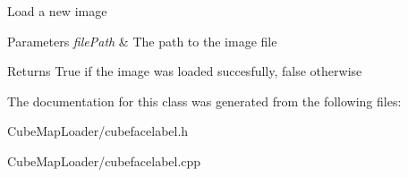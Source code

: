 \label{class_cube_face_label_af08e16abf6ad76b4bde6c39753e76042}
\-Load a new image 
\begin{DoxyParams}{\-Parameters}
{\em file\-Path} & \-The path to the image file \\
\hline
\end{DoxyParams}
\begin{DoxyReturn}{\-Returns}
\-True if the image was loaded succesfully, false otherwise 
\end{DoxyReturn}


\-The documentation for this class was generated from the following files\-:\begin{DoxyCompactItemize}
\item 
\-Cube\-Map\-Loader/cubefacelabel.\-h\item 
\-Cube\-Map\-Loader/cubefacelabel.\-cpp\end{DoxyCompactItemize}

